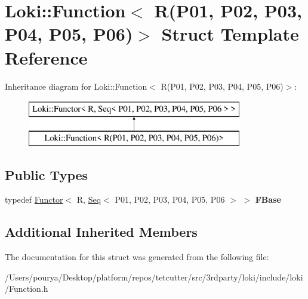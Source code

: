 \hypertarget{structLoki_1_1Function_3_01R_07P01_00_01P02_00_01P03_00_01P04_00_01P05_00_01P06_08_4}{}\section{Loki\+:\+:Function$<$ R(P01, P02, P03, P04, P05, P06)$>$ Struct Template Reference}
\label{structLoki_1_1Function_3_01R_07P01_00_01P02_00_01P03_00_01P04_00_01P05_00_01P06_08_4}
Inheritance diagram for Loki\+:\+:Function$<$ R(P01, P02, P03, P04, P05, P06)$>$\+:\begin{figure}[H]
\begin{center}
\leavevmode
\includegraphics[height=2.000000cm]{structLoki_1_1Function_3_01R_07P01_00_01P02_00_01P03_00_01P04_00_01P05_00_01P06_08_4}
\end{center}
\end{figure}
\subsection*{Public Types}
\begin{DoxyCompactItemize}
\item 
\hypertarget{structLoki_1_1Function_3_01R_07P01_00_01P02_00_01P03_00_01P04_00_01P05_00_01P06_08_4_a0de1e9b8e3bf3d3c52a0aa533858c123}{}typedef \hyperlink{classLoki_1_1Functor}{Functor}$<$ R, \hyperlink{structLoki_1_1Seq}{Seq}$<$ P01, P02, P03, P04, P05, P06 $>$ $>$ {\bfseries F\+Base}\label{structLoki_1_1Function_3_01R_07P01_00_01P02_00_01P03_00_01P04_00_01P05_00_01P06_08_4_a0de1e9b8e3bf3d3c52a0aa533858c123}

\end{DoxyCompactItemize}
\subsection*{Additional Inherited Members}


The documentation for this struct was generated from the following file\+:\begin{DoxyCompactItemize}
\item 
/\+Users/pourya/\+Desktop/platform/repos/tetcutter/src/3rdparty/loki/include/loki/Function.\+h\end{DoxyCompactItemize}
